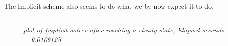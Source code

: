 \documentclass[english,a4paper,12pt]{article}
\begin{document}
The Implicit scheme also seems to do what we by now expect it to do.

\subsection*{}
\begin{figure}[H]
 \begin{center}
 \end{center}
 \caption{\textit{plot of Implicit solver after reaching a steady state,  Elapsed seconds =  0.0109125}}
 \label{fig:edge}
\end{figure}
\end{document}
